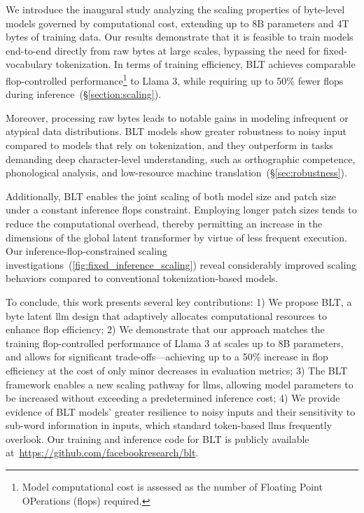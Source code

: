 We introduce the inaugural study analyzing the scaling properties of byte-level models governed by computational cost, extending up to 8B parameters and 4T bytes of training data. Our results demonstrate that it is feasible to train models end-to-end directly from raw bytes at large scales, bypassing the need for fixed-vocabulary tokenization. In terms of training efficiency, {\textsc BLT} achieves comparable flop-controlled performance\footnote{Model computational cost is assessed as the number of Floating Point OPerations (flops) required.} to Llama 3, while requiring up to 50\% fewer flops during inference~(\S\ref{section:scaling}). 

Moreover, processing raw bytes leads to notable gains in modeling infrequent or atypical data distributions. {\textsc BLT} models show greater robustness to noisy input compared to models that rely on tokenization, and they outperform in tasks demanding deep character-level understanding, such as orthographic competence, phonological analysis, and low-resource machine translation~(\S\ref{sec:robustness}). 

Additionally, {\textsc BLT} enables the joint scaling of both model size and patch size under a constant inference flops constraint. Employing longer patch sizes tends to reduce the computational overhead, thereby permitting an increase in the dimensions of the global latent transformer by virtue of less frequent execution. Our inference-flop-constrained scaling investigations~(\autoref{fig:fixed_inference_scaling}) reveal considerably improved scaling behaviors compared to conventional tokenization-based models.

To conclude, this work presents several key contributions: 1) We propose {\textsc BLT}, a byte latent llm design that adaptively allocates computational resources to enhance flop efficiency; 2) We demonstrate that our approach matches the training flop-controlled performance of Llama 3 at scales up to 8B parameters, and allows for significant trade-offs—achieving up to a 50\% increase in flop efficiency at the cost of only minor decreases in evaluation metrics; 3) The {\textsc BLT} framework enables a new scaling pathway for llms, allowing model parameters to be increased without exceeding a predetermined inference cost; 4) We provide evidence of {\textsc BLT} models’ greater resilience to noisy inputs and their sensitivity to sub-word information in inputs, which standard token-based llms frequently overlook. Our training and inference code for {\textsc BLT} is publicly available at~\url{https://github.com/facebookresearch/blt}.

